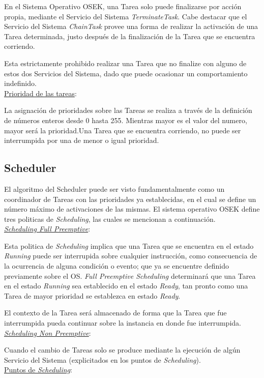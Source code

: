 \documentclass[12pt,letterpaper]{article}
\begin{document}
En el Sistema Operativo OSEK, una Tarea solo puede finalizarse por acción propia, mediante el Servicio del Sistema \textit{TerminateTask}. Cabe destacar que el Servicio del Sistema \textit{ChainTask} provee una forma de realizar la activación de una Tarea determinada, justo después de la finalización de la Tarea que se encuentra corriendo.

Esta estrictamente prohibido realizar una Tarea que no finalize con alguno de estos dos Servicios del Sistema, dado que puede ocasionar un comportamiento indefinido.\\
\underline{Prioridad de las tareas}:

La asignación de prioridades sobre las Tareas se realiza a través de la definición de números enteros desde 0 hasta 255\cite{libroosekcerdeiro}. Mientras mayor es el valor del numero, mayor será la prioridad.Una Tarea que se encuentra corriendo, no puede ser interrumpida por una de menor o igual prioridad.
\subsection{Scheduler}\label{sec:scheduler}
El algoritmo del Scheduler puede ser visto fundamentalmente como un coordinador de Tareas con las prioridades ya establecidas, en el cual se define un número máximo de activaciones de las mismas. El sistema operativo OSEK define tres politicas de \textit{Scheduling}, las cuales se mencionan a continuación.\\
\underline{\textit{Scheduling Full Preemptive}}:

Esta politica de \textit{Scheduling} implica que una Tarea que se encuentra en el estado \textit{Running} puede ser interrupida sobre cualquier instrucción, como consecuencia de la ocurrencia de alguna condición o evento; que ya se encuentre definido previamente sobre el OS. \textit{Full Preemptive Scheduling} determinará que una Tarea en el estado \textit{Running} sea establecido en el estado \textit{Ready}, tan pronto como una Tarea de mayor prioridad se establezca en estado \textit{\textit{Ready}}.

El contexto de la Tarea será almacenado de forma que la Tarea que fue interrumpida pueda continuar sobre la instancia en donde fue interrumpida.\\
\underline{\textit{Scheduling Non Preemptive}}:

Cuando el cambio de Tareas solo se produce mediante la ejecución de algún Servicio del Sistema (explicitados en los puntos de \textit{Scheduling}).\\
\underline{Puntos de \textit{Scheduling}}:
\end{document}
